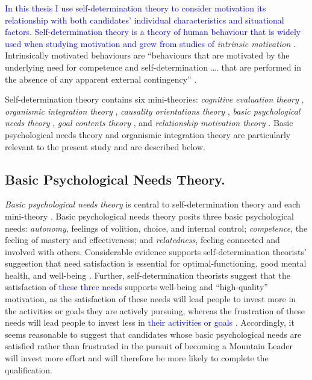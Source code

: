 \documentclass[
  12pt,
  a4paper,
]{book}
\begin{document}
\textcolor{blue}{In this thesis I use self-determination theory} \citep{Deci1985b, Deci2000, Ryan2017} \textcolor{blue}{to consider motivation its relationship with both candidates' individual characteristics and situational factors. Self-determination theory is a theory of human behaviour that is widely used when studying motivation} \citep[cf.~][]{Ryan2019} \textcolor{blue}{and grew from studies of} \emph{intrinsic motivation} \citep[e.g.,][]{Deci1975, Deci1980a}. Intrinsically motivated behaviours are ``behaviours that are motivated by the underlying need for competence and self-determination \ldots. that are performed in the absence of any apparent external contingency'' \citep[p 42]{Deci1980a}.

Self-determination theory contains six mini-theories: \emph{cognitive evaluation theory} \citep{Deci1975, Deci1980}, \emph{organismic integration theory} \citep{Deci1985b, Ryan1989}, \emph{causality orientations theory} \citep{Deci1985a}, \emph{basic psychological needs theory} \citep{Ryan2000a}, \emph{goal contents theory} \citep{Kasser1996, Niemiec2009}, and \emph{relationship motivation theory} \citep{Deci2014, Ryan2017}. Basic psychological needs theory and organismic integration theory are particularly relevant to the present study and are described below.

\hypertarget{basic-psychological-needs-theory.}{%
\subsection{Basic Psychological Needs Theory.}\label{basic-psychological-needs-theory.}}

\emph{Basic psychological needs theory} is central to self-determination theory and each mini-theory \citep{Ryan2002}. Basic psychological needs theory posits three basic psychological needs: \emph{autonomy}, feelings of volition, choice, and internal control; \emph{competence}, the feeling of mastery and effectiveness; and \emph{relatedness}, feeling connected and involved with others. Considerable evidence supports self-determination theorists' suggestion that need satisfaction is essential for optimal-functioning, good mental health, and well-being \citep[e.g.,][]{Chen2015, Deci2000}. Further, self-determination theorists suggest that the satisfaction of \textcolor{blue}{these three needs} supports well-being and ``high-quality'' motivation, as the satisfaction of these needs will lead people to invest more in the activities or goals they are actively pursuing, whereas the frustration of these needs will lead people to invest less in \textcolor{blue}{their activities or goals} \citep{Ryan2019}. Accordingly, it seems reasonable to suggest that candidates whose basic psychological needs are satisfied rather than frustrated in the pursuit of becoming a Mountain Leader will invest more effort and will therefore be more likely to complete the qualification.
\end{document}
